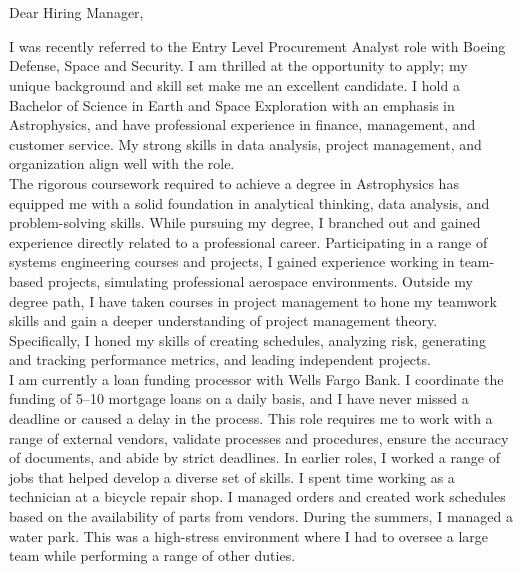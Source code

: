 \section{}




\bigskip

Dear Hiring Manager, 

\bigskip
\bigskip


\hspace{1cm}I was recently referred to the Entry Level Procurement Analyst role with Boeing Defense, Space and Security. I am thrilled at the opportunity to apply; my unique background and skill set make me an excellent candidate. I hold a Bachelor of Science in Earth and Space Exploration with an emphasis in Astrophysics, and have professional experience in finance, management, and customer service. My strong skills in data analysis, project management, and organization align well with the role. \\
\medskip
\hspace{1cm}The rigorous coursework required to achieve a degree in Astrophysics has equipped me with a solid foundation in analytical thinking, data analysis, and problem-solving skills. While pursuing my degree, I branched out and gained experience directly related to a professional career. Participating in a range of systems engineering courses and projects, I gained experience working in team-based projects, simulating professional aerospace environments. Outside my degree path, I have taken courses in project management to hone my teamwork skills and gain a deeper understanding of project management theory. Specifically, I honed my skills of creating schedules, analyzing risk, generating and tracking performance metrics, and leading independent projects. \\
\medskip
\hspace{1cm}I am currently a loan funding processor with Wells Fargo Bank. I coordinate the funding of 5--10 mortgage loans on a daily basis, and I have never missed a deadline or caused a delay in the process. This role requires me to work with a range of external vendors, validate processes and procedures, ensure the accuracy of documents, and abide by strict deadlines. In earlier roles, I worked a range of jobs that helped develop a diverse set of skills. I spent time working as a technician at a bicycle repair shop. I managed orders and created work schedules based on the availability of parts from vendors. During the summers, I managed a water park. This was a high-stress environment where I had to oversee a large team while performing a range of other duties. \\
